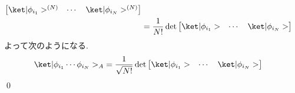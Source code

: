 \documentclass[uplatex,dvipdfmx,a4paper,11pt]{jlreq}
\makeatletter
\numberwithin{equation}{section}
\theoremstyle{definition}
\renewenvironment{proof}[1][\proofname]{\par
  \normalfont
  \topsep6\p@\@plus6\p@ \trivlist
  \item[\hskip\labelsep{\bfseries #1}\@addpunct{\bfseries}]\ignorespaces\quad\par
}{%
  \qed\endtrivlist\@endpefalse
}
\renewcommand\proofname{証明}
\makeatother
\begin{document}
\begin{proof}
\begin{align}
\begin{bmatrix}
                                                                               \ket|\phi_{i_1}>^{(N)} & \cdots & \ket|\phi_{i_N}>^{(N)}
                                                                             \end{bmatrix}                                      \\
                                                         & = \frac{1}{N!}\det\begin{bmatrix}
                                                                               \ket|\phi_{i_1}> & \cdots & \ket|\phi_{i_N}>
                                                                             \end{bmatrix}
  \end{align}
  よって次のようになる.
  \begin{align}
    \ket|\phi_{i_1}\cdots\phi_{i_N}>_A & = \frac{1}{\sqrt{N!}}\det\begin{bmatrix}\ket|\phi_{i_1}> & \cdots & \ket|\phi_{i_N}>\end{bmatrix}
  \end{align}
\end{proof}
\end{document}
